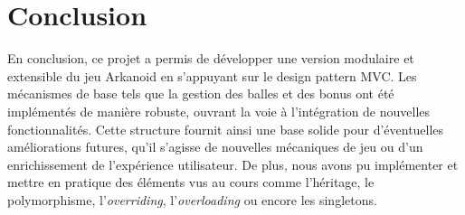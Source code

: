 \documentclass[utf8]{article}
\begin{document}
\section{Conclusion}
En conclusion, ce projet a permis de développer une version modulaire et extensible du jeu Arkanoid en s'appuyant sur le design pattern MVC. Les mécanismes de base tels que la gestion des balles et des bonus ont été implémentés de manière robuste, ouvrant la voie à l’intégration de nouvelles fonctionnalités. Cette structure fournit ainsi une base solide pour d'éventuelles améliorations futures, qu'il s'agisse de nouvelles mécaniques de jeu ou d'un enrichissement de l’expérience utilisateur.
De plus, nous avons pu implémenter et mettre en pratique des éléments vus au cours comme l'héritage, le polymorphisme, l'\emph{overriding}, l'\emph{overloading} ou encore les singletons.
\end{document}
